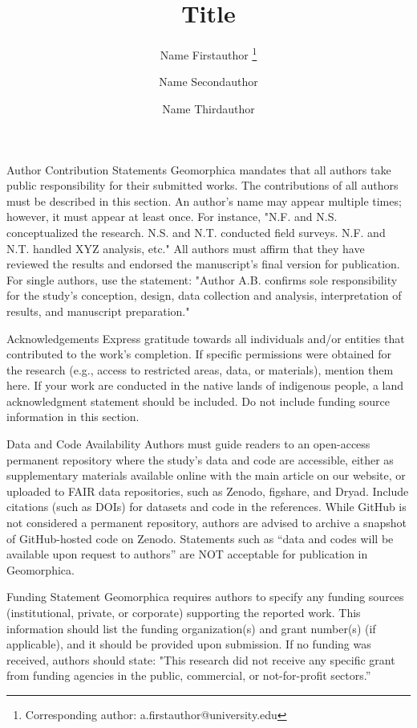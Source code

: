 \documentclass[titlepage]{geomorphica}
\title{Title}
\author[1]{Name Firstauthor
	\orcid{1111-1111-1111-1111}
	\thanks{Corresponding author: a.firstauthor@university.edu}
}
\author[2]{Name Secondauthor
	\orcid{2222-2222-2222-2222}
}
\author[1,3]{Name Thirdauthor
	\orcid{3333-3333-3333-3333}
}
\affil[1]{Department of Earth Sciences, A University, City, Country}
\affil[2]{School of Earth Sciences, Another University, City, Country}
\affil[3]{Center for Studying Cool Things, University of X, City, Country}
\begin{document}
\makegeomorphicatitle{}

\begin{closing}{Author Contribution Statements}
	Geomorphica mandates that all authors take public responsibility for their submitted works. The contributions of all authors must be described in this section. An author's name may appear multiple times; however, it must appear at least once. For instance, "N.F. and N.S. conceptualized the research. N.S. and N.T. conducted field surveys. N.F. and N.T. handled XYZ analysis, etc." All authors must affirm that they have reviewed the results and endorsed the manuscript's final version for publication. For single authors, use the statement: "Author A.B. confirms sole responsibility for the study's conception, design, data collection and analysis, interpretation of results, and manuscript preparation."
\end{closing}
\begin{closing}{Acknowledgements}
	Express gratitude towards all individuals and/or entities that contributed to the work's completion. If specific permissions were obtained for the research (e.g., access to restricted areas, data, or materials), mention them here. If your work are conducted in the native lands of indigenous people, a land acknowledgment statement should be included. Do not include funding source information in this section.
\end{closing}
\begin{closing}{Data and Code Availability}
	Authors must guide readers to an open-access permanent repository where the study's data and code are accessible, either as supplementary materials available online with the main article on our website, or uploaded to FAIR data repositories, such as Zenodo, figshare, and Dryad. Include citations (such as DOIs) for datasets and code in the references. While GitHub is not considered a permanent repository, authors are advised to archive a snapshot of GitHub-hosted code on Zenodo. Statements such as “data and codes will be available upon request to authors” are NOT acceptable for publication in Geomorphica.
\end{closing}
\begin{closing}{Funding Statement}
	Geomorphica requires authors to specify any funding sources (institutional, private, or corporate) supporting the reported work. This information should list the funding organization(s) and grant number(s) (if applicable), and it should be provided upon submission. If no funding was received, authors should state: "This research did not receive any specific grant from funding agencies in the public, commercial, or not-for-profit sectors.”
\end{closing}
\end{document}

